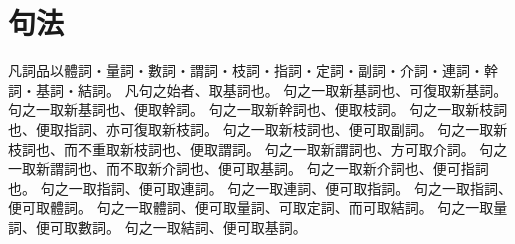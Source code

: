 \chapter*{句法}
凡詞品以體詞・量詞・數詞・謂詞・枝詞・指詞・定詞・副詞・介詞・連詞・幹詞・基詞・結詞。
凡句之始者、取基詞也。
句之一取新基詞也、可復取新基詞。
句之一取新基詞也、便取幹詞。
句之一取新幹詞也、便取枝詞。
句之一取新枝詞也、便取指詞、亦可復取新枝詞。
句之一取新枝詞也、便可取副詞。
句之一取新枝詞也、而不重取新枝詞也、便取謂詞。
句之一取新謂詞也、方可取介詞。
句之一取新謂詞也、而不取新介詞也、便可取基詞。
句之一取新介詞也、便可指詞也。
句之一取指詞、便可取連詞。
句之一取連詞、便可取指詞。
句之一取指詞、便可取體詞。
句之一取體詞、便可取量詞、可取定詞、而可取結詞。
句之一取量詞、便可取數詞。
句之一取結詞、便可取基詞。
